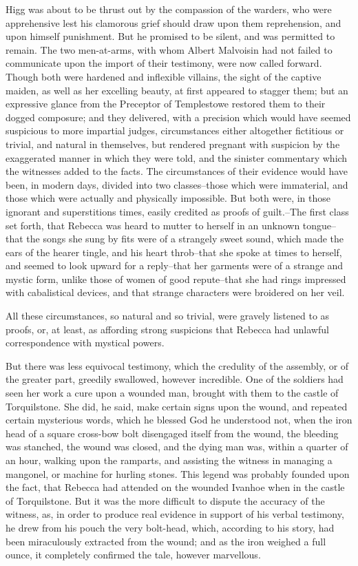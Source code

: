 Higg was about to be thrust out by the compassion of the warders, who
were apprehensive lest his clamorous grief should draw upon them
reprehension, and upon himself punishment. But he promised to be silent,
and was permitted to remain. The two men-at-arms, with whom Albert
Malvoisin had not failed to communicate upon the import of their
testimony, were now called forward. Though both were hardened and
inflexible villains, the sight of the captive maiden, as well as her
excelling beauty, at first appeared to stagger them; but an expressive
glance from the Preceptor of Templestowe restored them to their dogged
composure; and they delivered, with a precision which would have seemed
suspicious to more impartial judges, circumstances either altogether
fictitious or trivial, and natural in themselves, but rendered pregnant
with suspicion by the exaggerated manner in which they were told, and
the sinister commentary which the witnesses added to the facts. The
circumstances of their evidence would have been, in modern days, divided
into two classes--those which were immaterial, and those which were
actually and physically impossible. But both were, in those ignorant and
superstitions times, easily credited as proofs of guilt.--The first
class set forth, that Rebecca was heard to mutter to herself in an
unknown tongue--that the songs she sung by fits were of a strangely
sweet sound, which made the ears of the hearer tingle, and his heart
throb--that she spoke at times to herself, and seemed to look upward for
a reply--that her garments were of a strange and mystic form, unlike
those of women of good repute--that she had rings impressed with
cabalistical devices, and that strange characters were broidered on her
veil.

All these circumstances, so natural and so trivial, were gravely
listened to as proofs, or, at least, as affording strong suspicions that
Rebecca had unlawful correspondence with mystical powers.

But there was less equivocal testimony, which the credulity of the
assembly, or of the greater part, greedily swallowed, however
incredible. One of the soldiers had seen her work a cure upon a wounded
man, brought with them to the castle of Torquilstone. She did, he said,
make certain signs upon the wound, and repeated certain mysterious
words, which he blessed God he understood not, when the iron head of a
square cross-bow bolt disengaged itself from the wound, the bleeding was
stanched, the wound was closed, and the dying man was, within a quarter
of an hour, walking upon the ramparts, and assisting the witness in
managing a mangonel, or machine for hurling stones. This legend was
probably founded upon the fact, that Rebecca had attended on the wounded
Ivanhoe when in the castle of Torquilstone. But it was the more
difficult to dispute the accuracy of the witness, as, in order to
produce real evidence in support of his verbal testimony, he drew from
his pouch the very bolt-head, which, according to his story, had been
miraculously extracted from the wound; and as the iron weighed a full
ounce, it completely confirmed the tale, however marvellous.

